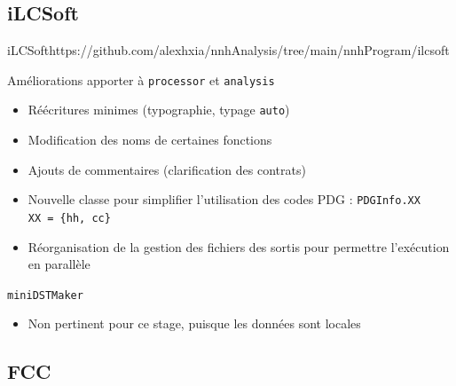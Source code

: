 \documentclass[9pt]{beamer}
\begin{document}
\subsection{iLCSoft}

\begin{frame}{iLCSoft}{https://github.com/alexhxia/nnhAnalysis/tree/main/nnhProgram/ilcsoft}

	\begin{block}{Améliorations apporter à \texttt{processor} et \texttt{analysis}}
		\begin{itemize}
			\item Réécritures minimes (typographie, typage \texttt{auto})
			\item Modification des noms de certaines fonctions
			\item Ajouts de commentaires (clarification des contrats)
			\item Nouvelle classe pour simplifier l'utilisation des codes PDG : \texttt{PDGInfo.XX}\\
					\texttt{XX = \{hh, cc\}}
			\item Réorganisation de la gestion des fichiers des sortis pour permettre l'exécution en parallèle 
		\end{itemize}
	\end{block}
	
	\begin{block}{\texttt{miniDSTMaker}}
		\begin{itemize}
			\item Non pertinent pour ce stage, puisque les données sont locales
		\end{itemize}
	\end{block}

\end{frame}

\subsection{FCC}
\end{document}

